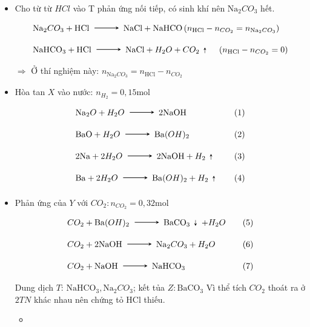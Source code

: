\begin{vd}
{\begin{itemize}
				\item Cho từ từ $ HCl$ vào T phản ứng nối tiếp, có sinh khí nên $\mathrm{Na}_2CO_3$ hết.
				\[
				\begin{aligned}
						& \mathrm{Na}_2 CO_3+\mathrm{HCl} \xrightarrow \mathrm{NaCl}+\mathrm{NaHCO}\left(n_{\mathrm{HCl}}-n_{CO_2}=n_{\mathrm{Na}_2 CO_3}\right) \\
						& \mathrm{NaHCO}_3+\mathrm{HCl} \xrightarrow \mathrm{NaCl}+H_2 O+CO_2 \uparrow \quad\left(n_{\mathrm{HCl}}-n_{CO_2}=0\right)
					\end{aligned}
				\]
				$\Rightarrow$ Ở thí nghiệm này: $n_{\mathrm{Na}_2 CO_3}=n_{\mathrm{HCl}}-n_{CO_2}$
			\end{itemize}
			    \begin{center}{}\end{center}
			  \begin{itemize}  	
				\item Hòa tan $X$ vào nước: $n_{H_2}=0,15\mathrm{mol}$
				\[
				\begin{aligned}
						& \mathrm{Na}_2 O+H_2 O\xrightarrow 2\mathrm{NaOH}&\quad \left(1\right) \\
						& \mathrm{BaO}+H_2 O\xrightarrow \mathrm{Ba}(OH)_2 &\quad \left(2\right)\\
						& 2\mathrm{Na}+2H_2 O\xrightarrow 2\mathrm{NaOH}+H_2 \uparrow &\quad \left(3\right) \\
						& \mathrm{Ba}+2H_2 O\xrightarrow \mathrm{Ba}(OH)_2+H_2 \uparrow &\quad \left(4\right)
					\end{aligned}
				\]
				\item Phản ứng của $Y$ với $CO_2: n_{CO_2}=0,32\mathrm{mol}$
				\[
				\begin{aligned}
						& CO_2+\mathrm{Ba}(OH)_2 \xrightarrow \mathrm{BaCO}_3 \downarrow+H_2O &\quad \left(5\right)\\
						& CO_2+2\mathrm{NaOH} \xrightarrow \mathrm{Na}_2CO_3+H_2O&\quad \left(6\right)\\
						& CO_2+\mathrm{NaOH} \xrightarrow \mathrm{NaHCO}_3& \quad \left(7\right)
					\end{aligned}
				\]
				Dung dịch $T$: $\mathrm{NaHCO}_3, \mathrm{Na}_2 CO_3$; kết tủa $Z: \mathrm{BaCO}_3$
				Vì thể tích $CO_2$ thoát ra ở $2TN$ khác nhau nên chứng tỏ $\mathrm{HCl}$ thiếu.
				\begin{itemize}
					\item {}
					\[
					\begin{array}{ll}

\end{array}\]
\end{itemize}
\end{itemize}}
\end{vd}
